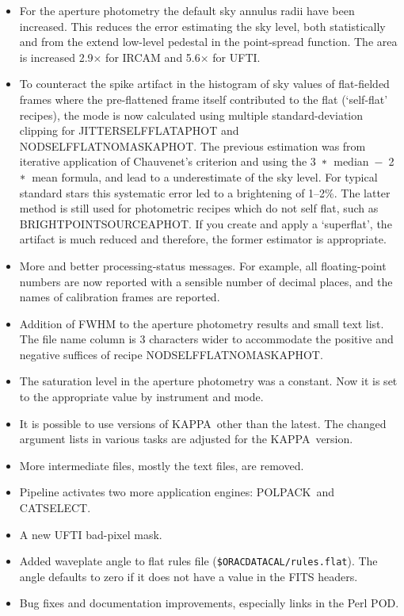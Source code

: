 \documentclass[twoside,11pt]{article}
\newcommand{\htmlref}[2]{#1}
\renewcommand{\_}{\texttt{\symbol{95}}}
\newcommand{\lsk}{\raisebox{-0.4ex}{\rm *}}
\newcommand{\KAPPA}{{\footnotesize KAPPA}}
\newcommand{\POLPACK}{{\footnotesize POLPACK}}
\begin{document}
\begin{itemize}
      The \_MAKE\_MOSAIC\_ primitive now has an argument to select
      various estimators should you prefer not to use the mean.
   \item For the aperture photometry the default sky annulus radii
      have been increased.  This reduces the error estimating the sky
      level, both statistically and from the extend low-level pedestal
      in the point-spread function.  The area is increased 2.9$\times$
      for IRCAM and 5.6$\times$ for UFTI. 
   \item To counteract the spike artifact in the histogram of sky values
      of flat-fielded frames where the pre-flattened frame itself
      contributed to the flat (`self-flat' recipes), the mode is
      now calculated using multiple standard-deviation clipping for
      \htmlref{JITTER\_SELF\_FLAT\_APHOT}{JITTER\_SELF\_FLAT\_APHOT} and
      \htmlref{NOD\_SELF\_FLAT\_NO\_MASK\_APHOT}{NOD\_SELF\_FLAT\_NO\_MASK\_APHOT}.
      The previous estimation was from iterative application of
      Chauvenet's criterion and using the \mbox{3 $\lsk$ median $-$ 2 $\lsk$ mean}
      formula, and lead to a underestimate of the sky level.  For
      typical standard stars this systematic error led to a
      brightening of 1--2\%.  The latter method is still used for
      photometric recipes which do not self flat, such as
      \htmlref{BRIGHT\_POINT\_SOURCE\_APHOT}{BRIGHT\_POINT\_SOURCE\_APHOT}.
      If you create and apply a `superflat', the artifact is much
      reduced and therefore, the former estimator is appropriate.
   \item More and better processing-status messages.  For example, all
      floating-point numbers are now reported with a sensible number of
      decimal places, and the names of calibration frames are reported.
   \item Addition of FWHM to the aperture photometry results and small
      text list.  The file name column is 3 characters wider to
      accommodate the positive and negative suffices of recipe
      \htmlref{NOD\_SELF\_FLAT\_NO\_MASK\_APHOT}{NOD\_SELF\_FLAT\_NO\_MASK\_APHOT}.
   \item The saturation level in the aperture photometry was a constant.
      Now it is set to the appropriate value by instrument and mode.
   \item It is possible to use versions of \KAPPA\  other than the
     latest.  The changed argument lists in various tasks are adjusted
     for the \KAPPA\  version.
   \item More intermediate files, mostly the text files, are removed.
   \item Pipeline activates two more application engines: \POLPACK\ and 
      {\footnotesize CATSELECT}.
   \item A new UFTI bad-pixel mask.
   \item Added waveplate angle to flat rules file ({\tt\$ORAC\_DATA\_CAL/rules.flat}).
        The angle defaults to zero if it does not have a value in the FITS
        headers.
   \item Bug fixes and documentation improvements, especially links in
      the Perl POD.
\end{itemize}

\end{document}
